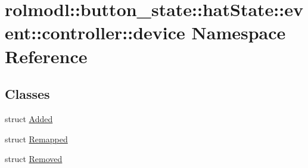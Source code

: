 \hypertarget{namespacerolmodl_1_1button__state_1_1hat_state_1_1event_1_1controller_1_1device}{}\section{rolmodl\+::button\+\_\+state\+::hat\+State\+::event\+::controller\+::device Namespace Reference}
\label{namespacerolmodl_1_1button__state_1_1hat_state_1_1event_1_1controller_1_1device}
\subsection*{Classes}
\begin{DoxyCompactItemize}
\item 
struct \mbox{\hyperlink{structrolmodl_1_1button__state_1_1hat_state_1_1event_1_1controller_1_1device_1_1_added}{Added}}
\item 
struct \mbox{\hyperlink{structrolmodl_1_1button__state_1_1hat_state_1_1event_1_1controller_1_1device_1_1_remapped}{Remapped}}
\item 
struct \mbox{\hyperlink{structrolmodl_1_1button__state_1_1hat_state_1_1event_1_1controller_1_1device_1_1_removed}{Removed}}
\end{DoxyCompactItemize}
